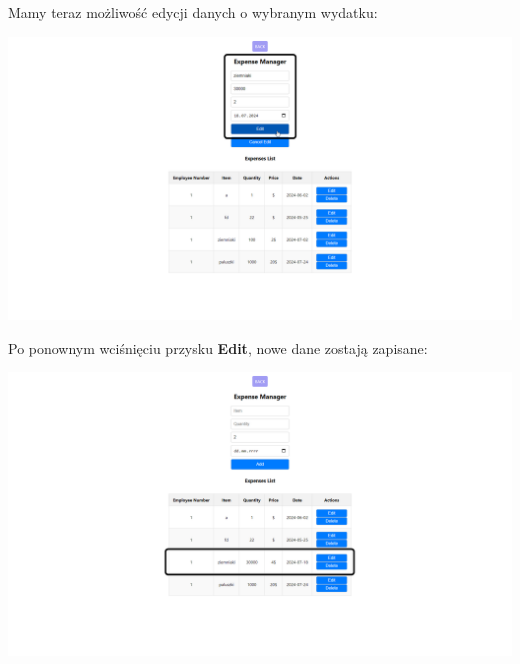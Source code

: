 \documentclass[12pt]{article}
\begin{document}
\begin{minipage}{\textwidth}
\noindent Mamy teraz możliwość edycji danych o wybranym wydatku:
\begin{center}
\includegraphics[width=\textwidth]{media/Expenses_newValues.png}
\end{center}
\end{minipage}

\begin{minipage}{\textwidth}
\noindent Po ponownym wciśnięciu przysku \textbf{Edit}, nowe dane zostają zapisane:
\begin{center}
\includegraphics[width=\textwidth]{media/Expenses_editSuccessfull.png}
\end{center}
\end{minipage}
\end{document}
